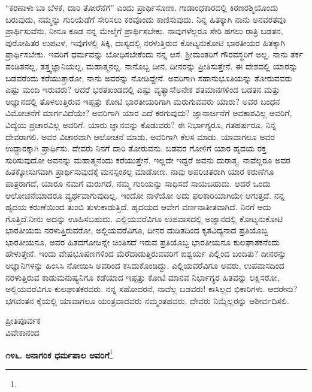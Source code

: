 “ಕರಣಾಳು ಬಾ ಬೆಳಕೆ, ದಾರಿ ತೋರೆನೆಗೆ'' ಎಂದು ಪ್ರಾರ್ಥಿಸೋಣ. ಗಾಡಾಂಧಕಾರದಲ್ಲಿ ಕಿರಣರಶ್ಮಿಯೊಂದು ಬರುವುದು, ನಮ್ಮನ್ನು ಗುರಿಯೆಡೆಗೆ ಸೇರಿಸಲು ಕರವೊಂದು ಕಾಣಿಸುವುದು. ನಿನ್ನ ಹಿತಕ್ಕಾಗಿ ನಾನು ಅನವರತವೂ ಪ್ರಾರ್ಥಿಸುವೆನು. ನೀನೂ ಕೂಡ ನನ್ನ ಮೇಲ್ಮೆಗೆ ಪ್ರಾರ್ಥಿಸಬೇಕು. ನಾವುಗಳೆಲ್ಲರೂ ಸೇರಿ ಹಗಲು ರಾತ್ರಿ ಬಡತನ, ಪುರೋಹಿತರ ಉಪಟಳ, ಇವುಗಳಲ್ಲಿ ಸಿಕ್ಕಿ, ದಾಸ್ಯದಲ್ಲಿ ನರಳುತ್ತಿರುವ ಕೋಟ್ಯನುಕೋಟಿ ಭಾರತೀಯರ ಹಿತಕ್ಕಾಗಿ ಪ್ರಾರ್ಥಿಸಬೇಕು. ಇವರಿಗೆ ಧರ್ಮವನ್ನು ಬೋಧಿಸಬೇಕೆಂದು ನನ್ನ ಆಸೆ. ಶ‍್ರೀಮಂತರಿಗೆ ಗೌರವಸ್ಥರಿಗೆ ಅಲ್ಲ. ನಾನು ತರ್ಕ ಪಂಡಿತನಲ್ಲ, ತತ್ತ್ವಜ್ಞಾನಿಯಲ್ಲ, ಮಹಾತ್ಮನಲ್ಲ. ನಾನೊಬ್ಬ ದೀನ, ದೀನರನ್ನು ಪ್ರೀತಿಸುತ್ತೇನೆ. ಈ ದೇಶದಲ್ಲಿ ಯಾರನ್ನು ಬಡವರೆಂದು ಕರೆಯುತ್ತಾರೋ, ನಾನು ಅವರನ್ನು ನೋಡಿದ್ದೇನೆ. ಅವರಿಗಾಗಿ ಸಹಾನುಭೂತಿಯನ್ನು ತೋರುವವರು ಎಷ್ಟು ಮಂದಿ ಇರುವರು? ಆದರೆ ಭರತಖಂಡದಲ್ಲಿ ಎಷ್ಟು ವ್ಯತ್ಯಾಸ!ಅನೇಕ ಶತಮಾನಗಳಿಂದ ಬಡತನ ಮತ್ತು ಅಜ್ಞಾನದಲ್ಲಿ ತೊಳಲುತ್ತಿರುವ ಇಪ್ಪತ್ತು ಕೋಟಿ ಭಾರತೀಯರಿಗಾಗಿ ಮರುಗುವವರು ಯಾರು? ಅವರ ಬಂಧನ ವಿಮೋಚನೆಗೆ ಮಾರ್ಗವಿದೆಯೇ? ಅವರಿಗಾಗಿ ಯಾರ ಎದೆ ಕರಗುವುದು? ಜ್ಞಾನಾರ್ಜನೆಗೆ ಅವಕಾಶವಿಲ್ಲ ಅವರಿಗೆ, ವಿದ್ಯೆಯ ಪ್ರಚಾರವಿಲ್ಲ ಅವರಿಗೆ. ಯಾರು ಜ್ಞಾನವನ್ನು ಕೊಡುವರು? ಈ ನಿರ್ಭಾಗ್ಯರೂ, ಗತಹರ್ಷರೂ, ನಿನ್ನ ದೇವರಾಗಲಿ. ಅವರ ವಿಚಾರವಾಗಿ ಆಲೋಚನೆ ಮಾಡು. ಅವರಿಗಾಗಿ ಕೆಲಸ ಮಾಡು. ಯಾವಾಗಲೂ ಅವರ ಉದ್ಧಾರಕ್ಕಾಗಿ ಪ್ರಾರ್ಥಿಸು. ದೇವರು ನಿನಗೆ ದಾರಿ ತೋರುವನು. ಬಡವರ ಗೋಳಿಗೆ ಯಾರ ಹೃದಯ ರಕ್ತ ಸುರಿಸುವುದೋ ಅವನನ್ನು ಮಹಾತ್ಮನೆಂದು ಕರೆಯುತ್ತೇನೆ. ಇಲ್ಲದೇ ಇದ್ದರೆ ಅವನು ದುರಾತ್ಮ. ನಾವೆಲ್ಲರೂ ಅವರ ಹಿತಕ್ಕೋಸುಗವಾಗಿ ಪ್ರಾರ್ಥಿಸುವುದಕ್ಕೆ ಮನಸ್ಸಂಕಲ್ಪ ಮಾಡೋಣ. ನಾವು ಅಪರಿಚಿತರಾಗಿ ಯಾರ ಕರುಣೆಗೂ ಪಾತ್ರರಾಗದೆ, ಯಾರೂ ನಮಗೆ ಮರುಗದೆ, ನಮ್ಮ ಗುರಿಯನ್ನು ಸಾಧಿಸದೆ ಸಾಯಬಹುದು. ಆದರೆ ಒಂದು ಆಲೋಚನೆಯಾದರೂ ವ್ಯರ್ಥವಾಗುವುದಿಲ್ಲ. ಇಂದೋ ನಾಳೆಯೋ ಅದು ಫಲಕಾರಿಯಾಗಿಯೇ ಆಗುತ್ತದೆ. ನನ್ನ ಹೃದಯ ಕರುಣೆಯಿಂದ ತುಂಬಿ ತುಳುಕಾಡುತ್ತಿದೆ. ಹೃದಯದ ಆವೇಗ ವರ್ಣನಾತೀತವಾಗಿದೆ. ನಿನಗೆ ಅದು ಗೊತ್ತಿದೆ.ನೀನು ಅದನ್ನು ಊಹಿಸಬಹುದು. ಎಲ್ಲಿಯವರೆವಿಗೂ ಉಪವಾಸದಲ್ಲಿ ಅಜ್ಞಾನದಲ್ಲಿ ಕೋಟ್ಯನುಕೋಟಿ ಭಾರತೀಯರು ನರಳುತ್ತಿರುವರೋ, ಅಲ್ಲಿಯವರೆವಿಗೂ, ದೀನರ ದುಡಿತದಿಂದ ಕೃತವಿದ್ಯನಾದ ಪ್ರತಿಯೊಬ್ಬ ಭಾರತೀಯನೂ, ಅವರ ಹಿತದಗೋಜನ್ನೇ ಚಿಂತಿಸದೆ ಇರುವ ಪ್ರತಿಯೊಬ್ಬ ಭಾರತೀಯನೂ ಕುಲಘಾತಕನೆಂದು ಹೇಳುತ್ತೇನೆ. ಇಂದು ವೇಷಭೂಷಣಗಳಿಂದ ಮೆರೆದಾಡುತ್ತಿರುವವರಿಗೆ ಐಶ್ವರ್ಯ ಎಲ್ಲಿಂದ ಬಂದಿತು? ದೀನರನ್ನು ಅಜ್ಞಾನಿಗಳನ್ನು ಹಿಂಸಿಸಿ ನೋಯಿಸಿ ಅವರಿಂದ ಕಸಿದುಕೊಂಡಿದ್ದು. ಎಲ್ಲಿಯವರೆವಿಗೂ ಅವರು, ಉಪವಾಸದಿಂದ ನರಳುತ್ತಿರುವ ಕಾಡುಮನುಷ್ಯನಿಗೂ ಕಡೆಯಾದ ಇಪ್ಪತ್ತು ಕೋಟಿ ಮಾನವ ನಿರ್ಭಾಗ್ಯರ ಹಿತವನ್ನು ಲಕ್ಷಿಸರೋ, ಅಲ್ಲಿಯವರೆವಿಗೂ ಕುಲಘಾತಕರವರು. ನನ್ನ ಸಹೋದರನೆ, ನಾವೆಲ್ಲ ಬಡವರು! ಕಾಸಿಲ್ಲದ ಭಿಕಾರಿಗಳು. ಆದರೇನು? ಭಗವಂತನ ಕೈಯಲ್ಲಿ ಯಾವಾಗಲೂ ಯಂತ್ರವಾದವರು ನಮ್ಮಂತಹವರು. ದೇವರು ನಿಮ್ಮೆಲ್ಲರನ್ನು ಆಶೀರ್ವದಿಸಲಿ.

\vspace{-0.5cm}

{\flushright
ಪ್ರೀತಿಪೂರ್ವಕ\\ವಿವೇಕಾನಂದ\par}

\begin{center}
\textbf{೧೪೬. ಅನಾಗರಿಕ ಧರ್ಮಪಾಲ ಅವರಿಗೆ}\footnote{}
\end{center}

